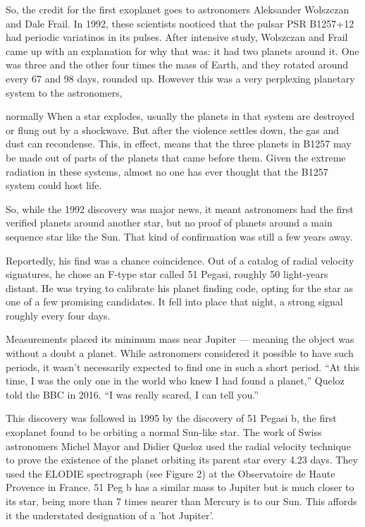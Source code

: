 So, the credit for the first exoplanet goes to astronomers Aleksander Wolszczan and Dale Frail.
In 1992, these scientists nooticed that the pulsar PSR B1257+12 had periodic variatinos in its pulses.
After intensive study, Wolszczan and Frail came up with an explanation for why that was: it had two planets around it. One was three and the other four times the mass of Earth, and they rotated around every 67 and 98 days, rounded up.
However this was a very perplexing planetary system to the astronomers, 

normally When a star explodes, usually the planets in that system are destroyed or flung out by a shockwave. But after the violence settles down, the gas and dust can recondense. This, in effect, means that the three planets in B1257 may be made out of parts of the planets that came before them. Given the extreme radiation in these systems, almost no one has ever thought that the B1257 system could host life.

So, while the 1992 discovery was major news, it meant astronomers had the first verified planets around another star, but no proof of planets around a main sequence star like the Sun. That kind of confirmation was still a few years away.



Reportedly, his find was a chance coincidence. Out of a catalog of radial velocity signatures, he chose an F-type star called 51 Pegasi, roughly 50 light-years distant. He was trying to calibrate his planet finding code, opting for the star as one of a few promising candidates. It fell into place that night, a strong signal roughly every four days.

Measurements placed its minimum mass near Jupiter —  meaning the object was without a doubt a planet. While astronomers considered it possible to have such periods, it wasn’t necessarily expected to find one in such a short period. “At this time, I was the only one in the world who knew I had found a planet,” Queloz told the BBC in 2016. “I was really scared, I can tell you.”


This discovery was followed in 1995 by the discovery of 51 Pegasi b, the first exoplanet found to be orbiting a normal Sun-like star. The work of Swiss astronomers Michel Mayor and Didier Queloz used the radial velocity technique to prove the existence of the planet orbiting its parent star every 4.23 days. They used the ELODIE spectrograph (see Figure 2) at the Observatoire de Haute Provence in France. 51 Peg b has a similar mass to Jupiter but is much closer to its star, being more than 7 times nearer than Mercury is to our Sun. This affords it the understated designation of a 'hot Jupiter'.


